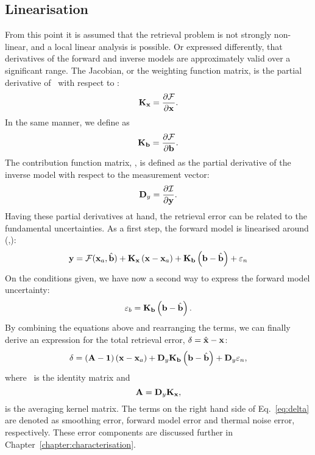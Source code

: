 \subsection{Linearisation}
%
From this point it is assumed that the retrieval problem is not strongly
non-linear, and a local linear analysis is possible. Or expressed differently,
that derivatives of the forward and inverse models are approximately valid over
a significant range. The Jacobian, or the weighting function matrix, is the
partial derivative of \FrwMdl\ with respect to \SttVct:
\begin{equation}
  \label{eq:kx}
  \mathbf{K}_{\mathbf{x}} = \frac{\partial\mathcal{F}}{\partial\mathbf{x}}.
\end{equation}
In the same manner, we define \aWfnMtr{\FrwMdlVct} as
\begin{equation}
  \label{eq:kb}
  \mathbf{K}_{\mathbf{b}} = \frac{\partial\mathcal{F}}{\partial\mathbf{b}}.
\end{equation}
The contribution function matrix, \CtrFncMtr, is defined as the partial
derivative of the inverse model with respect to the measurement vector:
\begin{equation}
  \label{eq:dy}
  \mathbf{D}_{y} = \frac{\partial\mathcal{I}}{\partial\mathbf{y}}.
\end{equation}
Having these partial derivatives at hand, the retrieval error can be related
to the fundamental uncertainties. As a first step, the forward model is
linearised around (,\FrwMdlVctHat):
\begin{equation}
  \label{eq:fmodel3}
  \mathbf{y} = \mathcal{F}(\mathbf{x}_{a},\hat{\mathbf{b}}) + 
  \mathbf{K}_{\mathbf{x}}\left(\mathbf{x}-\mathbf{x}_{a}\right) +
  \mathbf{K}_{\mathbf{b}}\left(\mathbf{b}-\hat{\mathbf{b}}\right) +
  \varepsilon_n
\end{equation}
On the conditions given, we have now a second way to express the forward
model uncertainty:
\begin{equation}
  \varepsilon_b = \mathbf{K}_{\mathbf{b}}\left(\mathbf{b}-\hat{\mathbf{b}}\right).
\end{equation}
By combining the equations above and rearranging the terms, we can finally
derive an expression for the total retrieval error, $\delta = \hat{\mathbf{x}} - \mathbf{x}$:
\begin{equation}
  \label{eq:delta}
  \delta =  \left(\mathbf{A}-\mathbf{1}\right)
    \left(\mathbf{x}-\mathbf{x}_{a}\right) + 
    \mathbf{D}_{y}\mathbf{K}_{\mathbf{b}}\left(\mathbf{b}-\hat{\mathbf{b}}\right) +
    \mathbf{D}_{y}\varepsilon_n,
\end{equation}
where \IdnMtr\ is the identity matrix and
\begin{equation}
  \label{eq:A}
  \mathbf{A} = \mathbf{D}_{y}\mathbf{K}_{\mathbf{x}},
\end{equation}
is the averaging kernel matrix. The terms on the right hand side of
Eq.~\ref{eq:delta} are denoted as smoothing error, forward model error and
thermal noise error, respectively. These error components are discussed further
in Chapter~\ref{chapter:characterisation}.


